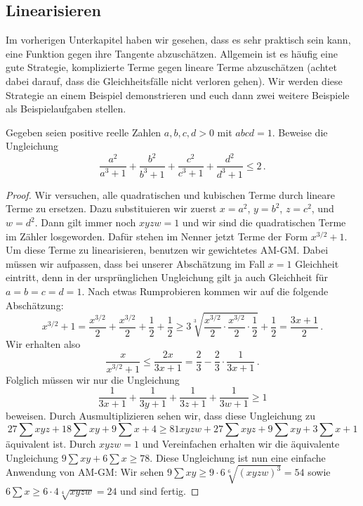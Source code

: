 \subsection*{Linearisieren}
Im vorherigen Unterkapitel haben wir gesehen, dass es sehr praktisch sein kann, eine Funktion gegen ihre Tangente abzuschätzen. Allgemein ist es häufig eine gute Strategie, komplizierte Terme gegen lineare Terme abzuschätzen (achtet dabei darauf, dass die Gleichheitsfälle nicht verloren gehen). Wir werden diese Strategie an einem Beispiel demonstrieren und euch dann zwei weitere Beispiele als Beispielaufgaben stellen.
\begin{aufgabe*}\label{aufgabe:AIMO2014}
	Gegeben seien positive reelle Zahlen $a,b,c,d>0$ mit $abcd=1$. Beweise die Ungleichung
	\begin{equation*}
		\frac{a^2}{a^3+1}+\frac{b^2}{b^3+1}+\frac{c^2}{c^3+1}+\frac{d^2}{d^3+1}\leqslant 2\,.
	\end{equation*}
\end{aufgabe*}
\begin{proof}
	Wir versuchen, alle quadratischen und kubischen Terme durch lineare Terme zu ersetzen. Dazu substituieren wir zuerst $x=a^2$, $y=b^2$, $z=c^2$, und $w=d^2$. Dann gilt immer noch $xyzw=1$ und wir sind die quadratischen Terme im Zähler losgeworden. Dafür stehen im Nenner jetzt Terme der Form $x^{3/2}+1$. Um diese Terme zu linearisieren, benutzen wir gewichtetes AM-GM. Dabei müssen wir aufpassen, dass bei unserer Abschätzung im Fall $x=1$ Gleichheit eintritt, denn in der ursprünglichen Ungleichung gilt ja auch Gleichheit für $a=b=c=d=1$. Nach etwas Rumprobieren kommen wir auf die folgende Abschätzung:
	\begin{equation*}
		x^{3/2}+1=\frac{x^{3/2}}2+\frac{x^{3/2}}2+\frac12+\frac12\geqslant 3\sqrt[3]{\frac{x^{3/2}}2\cdot \frac{x^{3/2}}2\cdot\frac12}+\frac12=\frac{3x+1}{2}\,.
	\end{equation*}
	Wir erhalten also
	\begin{equation*}
		\frac{x}{x^{3/2}+1}\leqslant \frac{2x}{3x+1}=\frac23-\frac23\cdot \frac{1}{3x+1}\,.
	\end{equation*}
	Folglich müssen wir nur die Ungleichung
	\begin{equation*}
		\frac1{3x+1}+\frac1{3y+1}+\frac1{3z+1}+\frac1{3w+1}\geqslant 1
	\end{equation*}
	beweisen. Durch Ausmultiplizieren sehen wir, dass diese Ungleichung zu
	\begin{equation*}
		27\sum xyz+18\sum xy+9\sum x+4\geqslant 81xyzw+27\sum xyz+9\sum xy+3\sum x+1
	\end{equation*}
	äquivalent ist. Durch $xyzw=1$ und Vereinfachen erhalten wir die äquivalente Ungleichung $9\sum xy+6\sum x\geqslant 78$. Diese Ungleichung ist nun eine einfache Anwendung von AM-GM: Wir sehen $9\sum xy\geqslant 9\cdot 6\sqrt[6]{(xyzw)^3}=54$ sowie $6\sum x\geqslant 6\cdot 4\sqrt[4]{xyzw}=24$ und sind fertig.
\end{proof}

